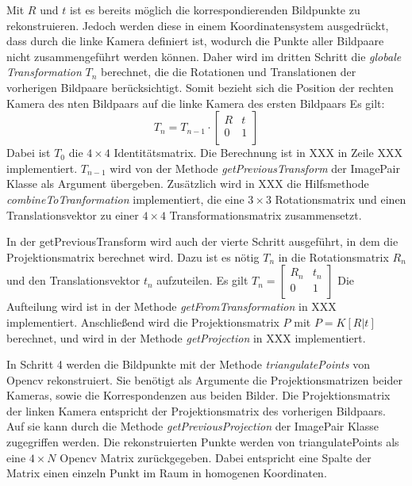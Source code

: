 Mit $R$ und $t$ ist es bereits möglich die korrespondierenden Bildpunkte zu rekonstruieren.
Jedoch werden diese in einem Koordinatensystem ausgedrückt, dass durch die linke Kamera definiert ist, wodurch die Punkte aller Bildpaare nicht zusammengeführt werden können.
Daher wird im dritten Schritt die \emph{globale Transformation} $T_n$ berechnet, die die Rotationen und Translationen der vorherigen Bildpaare berücksichtigt.
Somit bezieht sich die Position der rechten Kamera des nten Bildpaars auf die linke Kamera des ersten Bildpaars 
Es gilt:
\[ T_n = T_{n-1} \cdot \begin{bmatrix}
            R & t \\
            0 & 1 \\
        \end{bmatrix}
    \] 
Dabei ist $T_0$ die $4 \times 4$ Identitätsmatrix.
Die Berechnung ist in XXX in Zeile XXX implementiert.
$T_{n-1}$ wird von der Methode \emph{getPreviousTransform} der ImagePair Klasse als Argument übergeben. %
Zusätzlich wird in XXX die Hilfsmethode \emph{combineToTranformation} implementiert, die eine $3\times3$ Rotationsmatrix und einen Translationsvektor zu einer $4\times4$ Transformationsmatrix zusammensetzt.

In der getPreviousTransform wird auch der vierte Schritt ausgeführt, in dem die Projektionsmatrix berechnet wird.  
Dazu ist es nötig $T_n$ in die Rotationsmatrix $R_n$ und den Translationsvektor $t_n$ aufzuteilen. 
Es gilt $T_n = \begin{bmatrix}
                R_n & t_n \\
                0 & 1 \\
            \end{bmatrix}$
Die Aufteilung wird ist in der Methode \emph{getFromTransformation} in XXX implementiert.
Anschließend wird die Projektionsmatrix $P$ mit $P = K[R|t]$ berechnet, und wird in der Methode \emph{getProjection} in XXX implementiert.

In Schritt 4 werden die Bildpunkte mit der Methode \emph{triangulatePoints} von Opencv rekonstruiert.
Sie benötigt als Argumente die Projektionsmatrizen beider Kameras, sowie die Korrespondenzen aus beiden Bilder.
Die Projektionsmatrix der linken Kamera entspricht der Projektionsmatrix des vorherigen Bildpaars. 
Auf sie kann durch die Methode \emph{getPreviousProjection} der ImagePair Klasse zugegriffen werden.%
Die rekonstruierten Punkte werden von triangulatePoints als eine $4\times N$ Opencv Matrix zurückgegeben.
Dabei entspricht eine Spalte der Matrix einen einzeln Punkt im Raum in homogenen Koordinaten.

